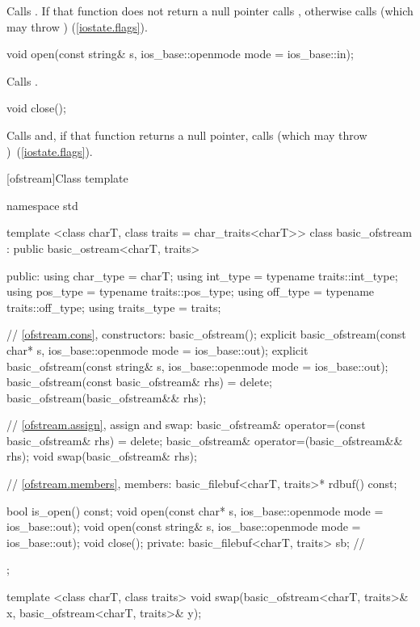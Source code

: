 \begin{itemdescr}
\pnum
\effects
Calls
.
If that function does not return a null pointer
calls ,
otherwise calls
(which may throw
) (\ref{iostate.flags}).
\end{itemdescr}

%
\begin{itemdecl}
void open(const string& s, ios_base::openmode mode = ios_base::in);
\end{itemdecl}

\begin{itemdescr}
\pnum
\effects Calls .
\end{itemdescr}

%
\begin{itemdecl}
void close();
\end{itemdecl}

\begin{itemdescr}
\pnum
\effects
Calls
and, if that function returns
a null pointer,
calls
(which may throw
)~(\ref{iostate.flags}).
\end{itemdescr}

[ofstream]{Class template }

%
\begin{codeblock}
namespace std {
  template <class charT, class traits = char_traits<charT>>
  class basic_ofstream
    : public basic_ostream<charT, traits> {
  public:
    using char_type   = charT;
    using int_type    = typename traits::int_type;
    using pos_type    = typename traits::pos_type;
    using off_type    = typename traits::off_type;
    using traits_type = traits;

    // \ref{ofstream.cons}, constructors:
    basic_ofstream();
    explicit basic_ofstream(const char* s,
                            ios_base::openmode mode = ios_base::out);
    explicit basic_ofstream(const string& s,
                            ios_base::openmode mode = ios_base::out);
    basic_ofstream(const basic_ofstream& rhs) = delete;
    basic_ofstream(basic_ofstream&& rhs);

    // \ref{ofstream.assign}, assign and swap:
    basic_ofstream& operator=(const basic_ofstream& rhs) = delete;
    basic_ofstream& operator=(basic_ofstream&& rhs);
    void swap(basic_ofstream& rhs);

    // \ref{ofstream.members}, members:
    basic_filebuf<charT, traits>* rdbuf() const;

    bool is_open() const;
    void open(const char* s, ios_base::openmode mode = ios_base::out);
    void open(const string& s, ios_base::openmode mode = ios_base::out);
    void close();
  private:
    basic_filebuf<charT, traits> sb; // \expos
  };

  template <class charT, class traits>
    void swap(basic_ofstream<charT, traits>& x,
              basic_ofstream<charT, traits>& y);
}
\end{codeblock}

